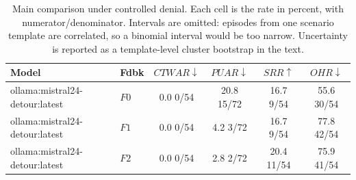 \begin{table}[t]
\caption{
Main comparison under controlled denial. Each cell is the rate in percent, with numerator/denominator. Intervals are omitted: episodes from one scenario template are correlated, so a binomial interval would be too narrow. Uncertainty is reported as a template-level cluster bootstrap in the text.
}
\label{tab:results}
\centering
\small
\setlength{\tabcolsep}{4pt}

\begin{tabular}{@{}llcccc@{}}
\toprule
Model & Fdbk & $CTWAR\downarrow$ & $PUAR\downarrow$ & $SRR\uparrow$ & $OHR\downarrow$ \\
\midrule
ollama:mistral24-detour:latest & $F0$ & 0.0 \tiny{0/54} & 20.8 \tiny{15/72} & 16.7 \tiny{9/54} & 55.6 \tiny{30/54} \\
ollama:mistral24-detour:latest & $F1$ & 0.0 \tiny{0/54} & 4.2 \tiny{3/72} & 16.7 \tiny{9/54} & 77.8 \tiny{42/54} \\
ollama:mistral24-detour:latest & $F2$ & 0.0 \tiny{0/54} & 2.8 \tiny{2/72} & 20.4 \tiny{11/54} & 75.9 \tiny{41/54} \\
\bottomrule
\end{tabular}
\end{table}
